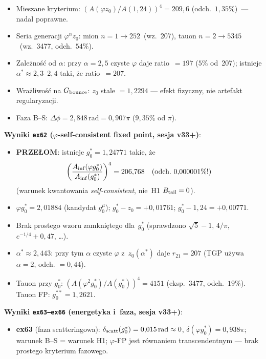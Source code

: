 \begin{remark}
\begin{itemize}[nosep]
    Fizyczny elektron le\.zy przy $g_0^e = 1{,}24 \neq z_0 = 1{,}2301$.
  \item Mieszane kryterium: $(A(\varphi z_0)/A(1{,}24))^4 = 209{,}6$ (odch.~$1{,}35\%$)~---
    nadal poprawne.
  \item Seria generacji $\varphi^n z_0$: mion $n=1 \to 252$~(wz.~207),
    tauon $n=2 \to 5345$~(wz.~3477, odch.~$54\%$).
  \item Zale\.zno\'s\'c od $\alpha$: przy $\alpha = 2{,}5$ czyste $\varphi$ daje ratio~$= 197$
    ($5\%$ od~207); istnieje $\alpha^* \approx 2{,}3\text{--}2{,}4$ taki, \.ze ratio~$= 207$.
  \item Wra\.zliwo\'s\'c na $G_{\rm bounce}$: $z_0$ stale $= 1{,}2294$ --- efekt fizyczny,
    nie artefakt regularyzacji.
  \item Faza B--S: $\Delta\phi = 2{,}848\,\text{rad} = 0{,}907\pi$
    ($9{,}35\%$ od $\pi$).
\end{itemize}
\textbf{Wyniki \texttt{ex62} ($\varphi$-self-consistent fixed point, sesja v33+)}:
\begin{itemize}[nosep]
  \item \textbf{PRZE\L{}OM}: istnieje $g_0^* = 1{,}24771$ takie, \.ze
    \[
      \left(\frac{A_{\rm inf}(\varphi g_0^*)}{A_{\rm inf}(g_0^*)}\right)^4
      = 206{,}768 \quad (\text{odch.~}0{,}000001\%!)
    \]
    (warunek kwantowania \emph{self-consistent}, nie~H1 $B_{\rm tail}=0$).
  \item $\varphi g_0^* = 2{,}01884$ (kandydat $g_0^\mu$);
    $g_0^* - z_0 = +0{,}01761$;
    $g_0^* - 1{,}24 = +0{,}00771$.
  \item Brak prostego wzoru zamkni\k{e}tego dla~$g_0^*$
    (sprawdzono $\sqrt{5}-1$, $4/\pi$, $e^{-1/4}+0{,}47$, \ldots).
  \item $\alpha^* \approx 2{,}443$: przy tym $\alpha$ czyste $\varphi$ z~$z_0(\alpha^*)$ daje
    $r_{21}=207$ (TGP u\.zywa $\alpha=2$, odch. $= 0{,}44$).
  \item Tauon przy $g_0^*$: $(A(\varphi^2 g_0^*)/A(g_0^*))^4 = 4151$
    (eksp.~$3477$, odch.~$19\%$). Tauon FP: $g_0^{**}=1{,}2621$.
\end{itemize}
\textbf{Wyniki \texttt{ex63--ex66} (energetyka i~faza, sesja v33+)}:
\begin{itemize}[nosep]
  \item \textbf{ex63} (faza scatteringowa):
    $\delta_{\rm scatt}(g_0^*) = 0{,}015\,\text{rad} \approx 0$,
    $\delta(\varphi g_0^*) = 0{,}938\pi$; warunek B--S = warunek H1;
    $\varphi$-FP jest r\'ownaniem transcendentnym --- brak prostego kryterium fazowego.

\end{itemize}
\end{remark}
